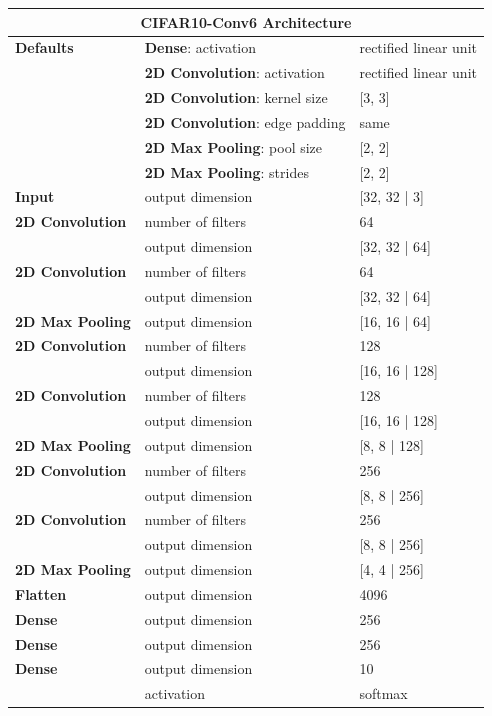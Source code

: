 	\begin{tabularx}{\textwidth}[!h]{X X X}
		\multicolumn{3}{c}{\textbf{CIFAR10-Conv6 Architecture}}
		\\
		\hline
		\endhead
		\textbf{Defaults} & \textbf{Dense}: activation & rectified linear unit\\
		& \textbf{2D Convolution}: activation & rectified linear unit\\
		& \textbf{2D Convolution}: kernel size & [3, 3]\\
		& \textbf{2D Convolution}: edge padding & same\\
		& \textbf{2D Max Pooling}: pool size & [2, 2]\\
		& \textbf{2D Max Pooling}: strides & [2, 2]\\
		\hline
		\textbf{Input} & output dimension & [32, 32 | 3]\\
		[8pt]
		\textbf{2D Convolution} & number of filters & 64\\
		& output dimension & [32, 32 | 64]\\
		[8pt]
		\textbf{2D Convolution} & number of filters & 64\\
		& output dimension & [32, 32 | 64]\\
		[8pt]
		\textbf{2D Max Pooling} & output dimension & [16, 16 | 64]\\
		[8pt]
		\textbf{2D Convolution} & number of filters & 128\\
		& output dimension & [16, 16 | 128]\\
		[8pt]
		\textbf{2D Convolution} & number of filters & 128\\
		& output dimension & [16, 16 | 128]\\
		[8pt]
		\textbf{2D Max Pooling} & output dimension & [8, 8 | 128]\\
		[8pt]
		\textbf{2D Convolution} & number of filters & 256\\
		& output dimension & [8, 8 | 256]\\
		[8pt]
		\textbf{2D Convolution} & number of filters & 256\\
		& output dimension & [8, 8 | 256]\\
		[8pt]
		\textbf{2D Max Pooling} & output dimension & [4, 4 | 256]\\
		[8pt]
		\textbf{Flatten} & output dimension & 4096\\
		[8pt]
		\textbf{Dense} & output dimension & 256\\
		[8pt]
		\textbf{Dense} & output dimension & 256\\
		[8pt]
		\textbf{Dense} & output dimension & 10\\
		& activation & softmax\\
		\hline
	\end{tabularx}

